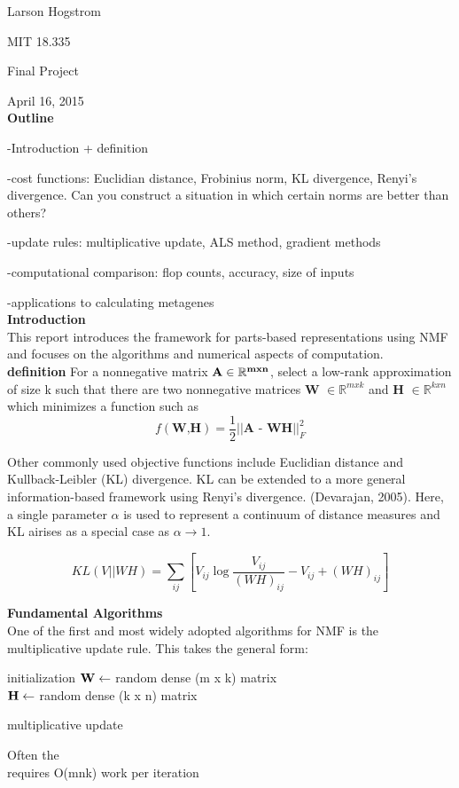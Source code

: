 \documentclass[12pt]{article}
\begin{document}
Larson Hogstrom 

MIT 18.335

Final Project

April 16, 2015 \\

\textbf{Outline}

-Introduction + definition

-cost functions: Euclidian distance, Frobinius norm, KL divergence, Renyi's divergence. Can you construct a situation in which certain norms are better than others?

-update rules: multiplicative update, ALS method, gradient methods

-computational comparison: flop counts, accuracy, size of inputs

-applications to calculating metagenes \\

\textbf{Introduction} \\
This report introduces the framework for parts-based representations using NMF and focuses on the algorithms and numerical aspects of computation. \\

\textbf{definition} For a nonnegative matrix $\bf{A} \in \mathbb{R}^{m x n}$, select a low-rank approximation of size k such that there are two nonnegative matrices \textbf{W} $ \in \mathbb{R}^{m x k}$ and \textbf{H} $ \in \mathbb{R}^{k x n}$ which minimizes a function such as 
$$ f( \textbf{W,H}) = \frac{1}{2} || \textbf{A - WH} || ^{2}_{F}$$


Other commonly used objective functions include Euclidian distance and Kullback-Leibler (KL) divergence. KL can be extended to a more general information-based framework using Renyi's divergence. (Devarajan, 2005). Here, a single parameter $\alpha$ is used to represent a continuum of distance measures and KL airises as a special case as $\alpha \to 1$. 

$$ KL(V || WH) = \sum_{ij}{[V_{ij} \log{ \frac{V_{ij}}{(WH)_{ij}} - V_{ij} + (WH)_{ij}} ]} $$





\pagebreak 
\textbf{Fundamental Algorithms} \\

One of the first and most widely adopted algorithms for NMF is the multiplicative update rule. This takes the general form: \\


\begin{algorithm}[H]

 initialization\;
$\bf{W} \gets $ random dense (m x k) matrix\\
$\bf{H} \gets $ random dense (k x n) matrix\\
 \caption{multiplicative update}
\end{algorithm} 


Often the \\
requires O(mnk) work per iteration
\end{document}
